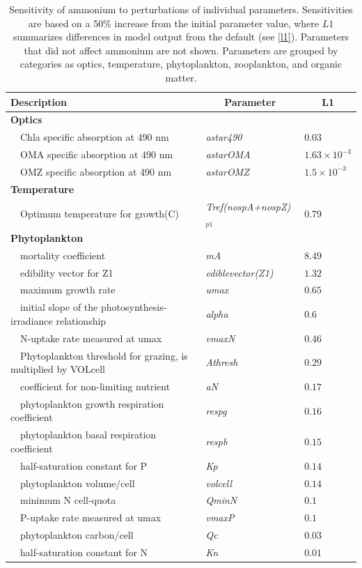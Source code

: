 \documentclass[preprint]{elsarticle}\usepackage[]{graphicx}\usepackage[]{color}
\begin{document}
\begin{table}[!tbp]
{\footnotesize
\caption{Sensitivity of ammonium to perturbations of individual parameters.  Sensitivities are based on a 50\% increase from the initial parameter value, where $L1$ summarizes differences in model output from the default (see \cref{l1}).  Parameters that did not affect ammonium are not shown.  Parameters are grouped by categories as optics, temperature, phytoplankton, zooplankton, and organic matter.\label{tab:nh4sens}} 
\begin{center}
\begin{tabular}{lll}
\hline\hline
\multicolumn{1}{l}{Description}&\multicolumn{1}{c}{Parameter}&\multicolumn{1}{c}{L1}\tabularnewline
\hline
{\bfseries Optics}&&\tabularnewline
~~Chla specific absorption at 490 nm&\textit{astar490}&$0.03$\tabularnewline
~~OMA specific absorption at 490 nm&\textit{astarOMA}&$1.63\times 10^{-3}$\tabularnewline
~~OMZ specific absorption at 490 nm&\textit{astarOMZ}&$1.5\times 10^{-3}$\tabularnewline
\hline
{\bfseries Temperature}&&\tabularnewline
~~Optimum temperature for growth(C)&\textit{Tref(nospA+nospZ)$_{p1}$}&$0.79$\tabularnewline
\hline
{\bfseries Phytoplankton}&&\tabularnewline
~~mortality coefficient&\textit{mA}&$8.49$\tabularnewline
~~edibility vector for Z1&\textit{ediblevector(Z1)}&$1.32$\tabularnewline
~~maximum growth rate&\textit{umax}&$0.65$\tabularnewline
~~initial slope of the photosynthesis-irradiance relationship&\textit{alpha}&$0.6$\tabularnewline
~~N-uptake rate measured at umax&\textit{vmaxN}&$0.46$\tabularnewline
~~Phytoplankton threshold for grazing, is multiplied by VOLcell&\textit{Athresh}&$0.29$\tabularnewline
~~coefficient for non-limiting nutrient&\textit{aN}&$0.17$\tabularnewline
~~phytoplankton growth respiration coefficient&\textit{respg}&$0.16$\tabularnewline
~~phytoplankton basal respiration coefficient&\textit{respb}&$0.15$\tabularnewline
~~half-saturation constant for P&\textit{Kp}&$0.14$\tabularnewline
~~phytoplankton volume/cell&\textit{volcell}&$0.14$\tabularnewline
~~minimum N cell-quota&\textit{QminN}&$0.1$\tabularnewline
~~P-uptake rate measured at umax&\textit{vmaxP}&$0.1$\tabularnewline
~~phytoplankton carbon/cell&\textit{Qc}&$0.03$\tabularnewline
~~half-saturation constant for N&\textit{Kn}&$0.01$\tabularnewline

\end{tabular}
\end{center}}
\end{table}
\end{document}
